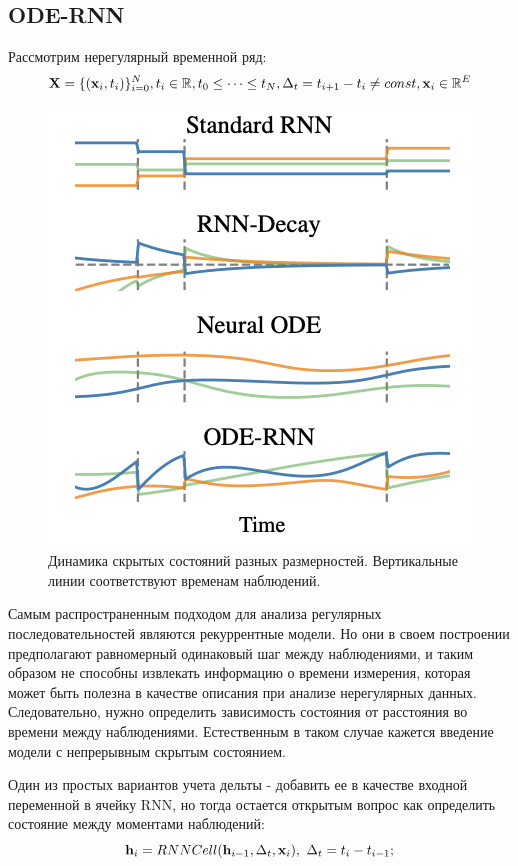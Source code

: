 \newpage
\subsection{ODE-RNN}

Рассмотрим нерегулярный временной ряд:
\begin{equation*}
    \textbf{X} = \{(\textbf{x}_i, t_i)\}_{i=0}^N, t_i\in \mathbb{R}, t_0 \le \dots \le t_N, \Delta_t = t_{i+1} - t_{i} \neq const, \textbf{x}_i \in \mathbb{R}^E
\end{equation*}

\begin{figure}
    \centering
    \includegraphics[scale=0.9]{chapters/varenik1/images/ode-rnn.png}
    \caption{Динамика скрытых состояний разных размерностей. Вертикальные линии соответствуют временам наблюдений.}
\end{figure}

Самым распространенным подходом для анализа регулярных последовательностей являются рекуррентные модели. Но они в своем построении предполагают равномерный одинаковый шаг между наблюдениями, и таким образом не способны извлекать информацию о времени измерения, которая может быть полезна в качестве описания при анализе нерегулярных данных. Следовательно, нужно определить зависимость состояния от расстояния во времени между наблюдениями. Естественным в таком случае кажется введение модели с непрерывным скрытым состоянием. 

Один из простых вариантов учета дельты - добавить ее в качестве входной переменной в ячейку RNN, но тогда остается открытым вопрос как определить состояние между моментами наблюдений:
\begin{equation*}
    \textbf{h}_i = RNNCell(\textbf{h}_{i-1}, \Delta_t, \textbf{x}_i), \text{ }\Delta_t = t_i - t_{i-1};
\end{equation*}

